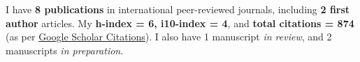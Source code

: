 
I have \textbf{8 publications} in international peer-reviewed journals, including \textbf{2 first author} articles. My \textbf{h-index = 6, i10-index = 4}, and \textbf{total citations = 874} (as per \href{https://scholar.google.com/citations?hl=en&user=6-7FYjIAAAAJ&authuser=2}{Google Scholar Citations}). I also have 1 manuscript \emph{in review}, and 2 manuscripts \emph{in preparation}.

\nocite{*}


\printbibliography[heading={none},title={Journal Articles},type=article]



